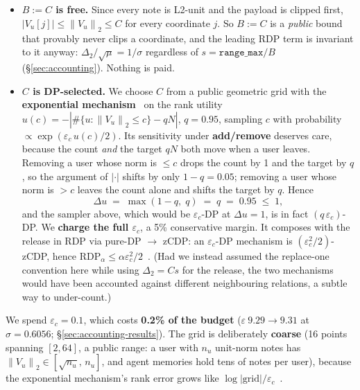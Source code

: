 \documentclass[pdflatex,sn-mathphys-num,12pt]{sn-jnl}
\theoremstyle{thmstyleone}%
\theoremstyle{thmstyletwo}%
\theoremstyle{thmstylethree}%
\newcommand{\eps}{\varepsilon}
\newcommand{\norm}[1]{\left\lVert #1 \right\rVert}
\newcommand{\secref}[1]{\S\ref{#1}}
\begin{document}
\begin{itemize}
  \item \textbf{$B := C$ is free.} Since every note is L2-unit and the payload is
    clipped first, $|V_u[j]| \leq \norm{V_u}_2 \leq C$ for every coordinate $j$. So
    $B := C$ is a \emph{public} bound that provably never clips a coordinate, and the
    leading RDP term is invariant to it anyway: $\Delta_2 / \sqrt{\mu} = 1/\sigma$
    regardless of $s = \texttt{range\_max}/B$ (\secref{sec:accounting}). Nothing is paid.

  \item \textbf{$C$ is DP-selected.} We choose $C$ from a public geometric grid
    with the \textbf{exponential mechanism}~\cite{mcsherry2007expmech} on the rank utility
    $u(c) = -\left| \#\{u : \norm{V_u}_2 \leq c\} - q N \right|$, $q = 0.95$,
    sampling $c$ with probability $\propto \exp(\eps_c \, u(c) / 2)$. Its
    sensitivity under \textbf{add/remove} deserves care, because the count
    \emph{and} the target $qN$ both move when a user leaves. Removing a user whose
    norm is $\leq c$ drops the count by 1 and the target by $q$, so the argument of
    $|\cdot|$ shifts by only $1 - q = 0.05$; removing a user whose norm is $> c$
    leaves the count alone and shifts the target by $q$. Hence
    \begin{equation}\label{eq:clip-sens}
      \Delta u \;=\; \max(1 - q,\; q) \;=\; q \;=\; 0.95 \;\leq\; 1,
    \end{equation}
    and the sampler above, which would be $\eps_c$-DP at $\Delta u = 1$, is in
    fact $(q\,\eps_c)$-DP. We \textbf{charge the full $\eps_c$}, a 5\% conservative
    margin. It composes with the release in RDP via pure-DP $\to$ zCDP: an
    $\eps_c$-DP mechanism is $(\eps_c^2/2)$-zCDP, hence
    $\mathrm{RDP}_\alpha \leq \alpha \eps_c^2 / 2$~\cite{bun2016zcdp}. (Had we
    instead assumed the replace-one convention here while using $\Delta_2 = C s$ for
    the release, the two mechanisms would have been accounted against different
    neighbouring relations, a subtle way to under-count.)
\end{itemize}

We spend $\eps_c = 0.1$, which costs \textbf{0.2\% of the budget}
($\eps\ 9.29 \to 9.31$ at $\sigma = 0.6056$; \secref{sec:accounting-results}). The
grid is deliberately \textbf{coarse} (16 points spanning $[2, 64]$, a public range:
a user with $n_u$ unit-norm notes has $\norm{V_u}_2 \in [\sqrt{n_u},\, n_u]$, and
agent memories hold tens of notes per user), because the exponential mechanism's
rank error grows like $\log|\mathrm{grid}| / \eps_c$~\cite{smith2011quantile}.
\end{document}
